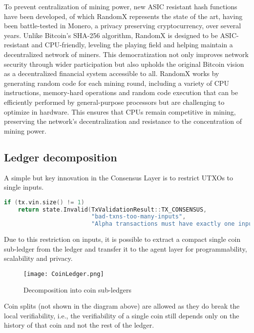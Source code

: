 \documentclass{article}
\begin{document}
To prevent centralization of mining power, new ASIC resistant hash functions have been developed, of which RandomX represents the state of the art, having been battle-tested in Monero, a privacy preserving cryptocurrency, over several years. Unlike Bitcoin's SHA-256 algorithm, RandomX is designed to be ASIC-resistant and CPU-friendly, leveling the playing field and helping maintain a decentralized network of miners. This democratization not only improves network security through wider participation but also upholds the original Bitcoin vision as a decentralized financial system accessible to all. RandomX works by generating random code for each mining round, including a variety of CPU instructions, memory-hard operations and random code execution that can be efficiently performed by general-purpose processors but are challenging to optimize in hardware. This ensures that CPUs remain competitive in mining, preserving the network's decentralization and resistance to the concentration of mining power.




\subsection{Ledger decomposition}


A simple but key innovation in the Consensus Layer is to restrict UTXOs to single inputs.

\begin{minipage}{\linewidth}
\begin{lstlisting}[language=C++]
if (tx.vin.size() != 1)
    return state.Invalid(TxValidationResult::TX_CONSENSUS,
                         "bad-txns-too-many-inputs",
                         "Alpha transactions must have exactly one input");
\end{lstlisting}
\end{minipage}

Due to this restriction on inputs, it is possible to extract a compact single coin sub-ledger from the ledger and transfer it to the agent layer for programmability, scalability and privacy.

\begin{figure}[H]
    \centering
    \texttt{[image: CoinLedger.png]}
    \caption{Decomposition into coin sub-ledgers}
    \label{fig:coinledger}
\end{figure}


Coin splits (not shown in the diagram above) are allowed as they do break the local verifiability, i.e., the verifiability of a single coin still depends only on the history of that coin and not the rest of the ledger.
\end{document}
